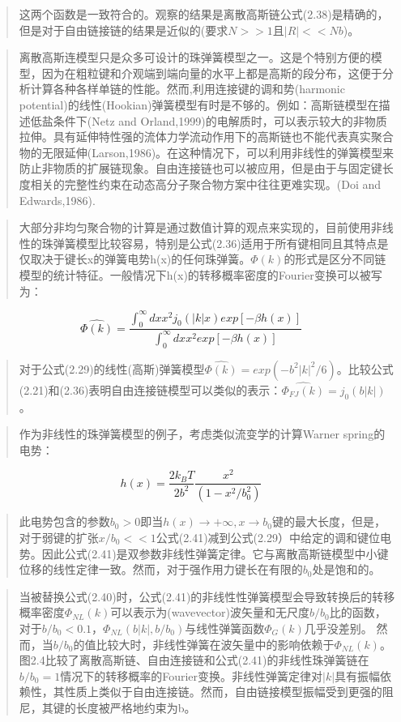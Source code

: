 \begin{quotation}
这两个函数是一致符合的。观察的结果是离散高斯链公式(2.38)是精确的，但是对于自由链接链的结果是近似的(要求$N>>1$且$|R|<<Nb$)。
\end{quotation}
\begin{quotation}
离散高斯连模型只是众多可设计的珠弹簧模型之一。这是个特别方便的模型，因为在粗粒键和介观端到端向量的水平上都是高斯的段分布，这便于分析计算各种各样单链的性能。然而,利用连接键的调和势(harmonic potential)的线性(Hookian)弹簧模型有时是不够的。例如：高斯链模型在描述低盐条件下(Netz and Orland,1999)的电解质时，可以表示较大的非物质拉伸。具有延伸特性强的流体力学流动作用下的高斯链也不能代表真实聚合物的无限延伸(Larson,1986)。在这种情况下，可以利用非线性的弹簧模型来防止非物质的扩展链现象。自由连接链也可以被应用，但是由于与固定键长度相关的完整性约束在动态高分子聚合物方案中往往更难实现。(Doi and Edwards,1986).
\end{quotation}
\begin{quotation}
大部分非均匀聚合物的计算是通过数值计算的观点来实现的，目前使用非线性的珠弹簧模型比较容易，特别是公式(2.36)适用于所有键相同且其特点是仅取决于键长x的弹簧电势h(x)的任何珠弹簧。$\varPhi(k)$的形式是区分不同链模型的统计特征。一般情况下h(x)的转移概率密度的Fourier变换可以被写为：
\end{quotation}
\begin{equation}
\hat{\varPhi(k)}=\frac{\int_{0}^{\infty} dx x^2j_{0}(|k|x)exp[-\beta h(x)]}{\int_{0}^{\infty} dx x^2exp[-\beta h(x)]} 
\end{equation}
\begin{quotation}
对于公式(2.29)的线性(高斯)弹簧模型$\hat{\varPhi(k)}=exp(-b^2|k|^2/6)$。比较公式(2.21)和(2.36)表明自由连接链模型可以类似的表示：$\hat{\varPhi_{FJ}(k)}=j_{0}(b|k|)$。
\end{quotation}
\begin{quotation}
作为非线性的珠弹簧模型的例子，考虑类似流变学的计算Warner spring的电势：
\end{quotation}
\begin{equation}
h(x)=\frac{2k_{B}T}{2b^2}\frac{x^2}{(1-x^2/b_{0}^2)}
\end{equation}
\begin{quotation}
此电势包含的参数$b_{0}>0$即当$h(x)\to +\infty,x\to b_{0}$键的最大长度，但是，对于弱键的扩张$x/b_{0}<<1$公式(2.41)减到公式(2.29）中给定的调和键位电势。因此公式(2.41)是双参数非线性弹簧定律。它与离散高斯链模型中小键位移的线性定律一致。然而，对于强作用力键长在有限的$b_{0}$处是饱和的。
\end{quotation}
\begin{quotation}
当被替换公式(2.40)时，公式(2.41)的非线性性弹簧模型会导致转换后的转移概率密度$\varPhi_{NL}(k)$可以表示为(wavevector)波矢量和无尺度$b/b_{0}$比的函数，对于$b/b_{0}<0.1$，$\varPhi_{NL}(b|k|,b/b_{0})$与线性弹簧函数$\varPhi_{G}(k)$几乎没差别。 然而，当$b/b_{0}$的值比较大时，非线性弹簧在波矢量中的影响依赖于$\varPhi_{NL}(k)$。图2.4比较了离散高斯链、自由连接链和公式(2.41)的非线性珠弹簧链在$b/b_{0}=1$情况下的转移概率的Fourier变换。非线性弹簧定律对$|k|$具有振幅依赖性，其性质上类似于自由连接链。然而，自由链接模型振幅受到更强的阻尼，其键的长度被严格地约束为b。
\end{quotation}
